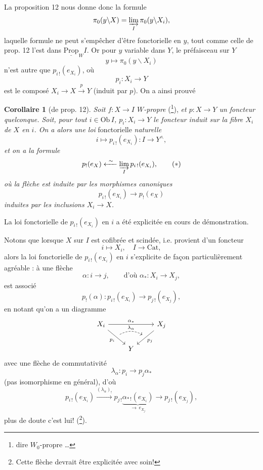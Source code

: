 \documentclass[11pt]{article}
\newcommand{\printedpage}[1]{\marginpar{\footnotesize p.~#1}}
\newcommand{\msp}[1]{\marginpar{\footnotesize [#1]}}
\begin{document}
\msp{page 118}
La proposition 12 nous donne donc la formule
\[
\pi_0(y\backslash X) = \varinjlim_{I} \pi_0(y\backslash X_i),
\]
laquelle formule ne peut s'empêcher d'être fonctorielle en $y$, tout comme celle de prop. 12 l'est dans $\underline{\mathrm{Prop}}_W I$. Or pour $y$ variable dans $Y$, le préfaisceau sur $Y$
\[
y \longmapsto \pi_0(y\backslash X_i)
\]
n'est autre que $p_{i\,!}(e_{X_i})$, où
\[
p_i : X_i \longrightarrow Y
\]
est le composé $X_i \longrightarrow X \xrightarrow{p} Y$ (induit par $p$). On a ainsi prouvé

\textbf{Corollaire 1} (de prop. 12). \textit{Soit $f : X \longrightarrow I$ $W$-propre} (\footnote[82]{dire $W_0$-propre \dots}), \textit{et $p : X \longrightarrow Y$ un foncteur quelconque. Soit, pour tout $i \in \mathrm{Ob}\, I$, $p_i : X_i \longrightarrow Y$ le foncteur induit sur la fibre $X_i$ de $X$ en $i$. On a alors une loi} fonctorielle \textit{naturelle}
\[
i \longmapsto p_{i\,!}(e_{X_i}) : I \longrightarrow Y^\wedge,
\]
\textit{et on a la formule}
\[
p_!(e_X) \xleftarrow{\ \sim\ } \varinjlim_{I} p_{i\,!}(e_{X_i}), \tag*{$(*)$}
\]
\textit{où la flèche est induite par les morphismes canoniques}
\[
p_{i\,!}(e_{X_i}) \longrightarrow p_!(e_X)
\]
\printedpage{81}
\msp{page 119}
\textit{induites par les inclusions $X_i \longrightarrow X$.}

La loi fonctorielle de $p_{i\,!}(e_{X_i})$ en $i$ a été explicitée en cours de démonstration.

Notons que lorsque $X$ sur $I$ est cofibrée et scindée, i.e. provient d'un foncteur
\[
i \longmapsto X_i, \quad I \longrightarrow \mathrm{Cat},
\]
alors la loi fonctorielle de $p_{i\,!}(e_{X_i})$ en $i$ s'explicite de façon particulièrement agréable : à une flèche
\[
\alpha : i \longrightarrow j, \qquad \text{d'où } \alpha_* : X_i \longrightarrow X_j,
\]
est associé
\[
p_!(\alpha) : p_{i\,!}(e_{X_i}) \longrightarrow p_{j\,!}(e_{X_j}),
\]
en notant qu'on a un diagramme
\[
\begin{tikzcd}
X_i \arrow[rr, "\alpha_*"] \arrow[dr, "p_i"', ""{name=A}] & & X_j \arrow[dl, "p_j", ""'{name=B}] \\
& Y &
\arrow[from=A, to=B, bend left, dashed, "\lambda_\alpha"] %
\end{tikzcd}
\]
avec une flèche de commutativité
\[
\lambda_\alpha : p_i \longrightarrow p_j\alpha_*
\]
(pas isomorphisme en général), d'où
\[
p_{i\,!}(e_{X_i}) \xrightarrow{(\lambda_\alpha)_!} p_{j\,!}\underbrace{\alpha_{*\,!}(e_{X_i})}_{\longrightarrow\, e_{X_j}} \longrightarrow p_{j\,!}(e_{X_j}),
\]
plus de doute c'est lui! (\footnote[83]{Cette flèche devrait être explicitée avec soin!}).
\end{document}
